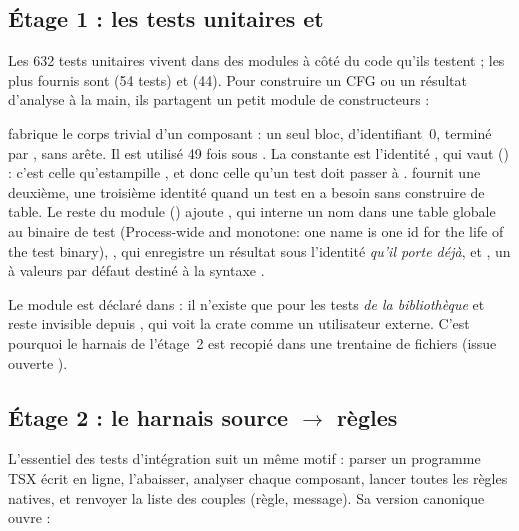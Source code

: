 \subsection{Étage 1 : les tests unitaires et }

Les 632 tests unitaires vivent dans des modules  à côté du code qu'ils testent ; les plus fournis sont  (54 tests) et  (44). Pour construire un CFG ou un résultat d'analyse à la main, ils partagent un petit module de constructeurs :


 fabrique le corps trivial d'un composant : un seul bloc, d'identifiant~0, terminé par , sans arête. Il est utilisé 49 fois sous . La constante  est l'identité , qui vaut  () : c'est celle qu'estampille , et donc celle qu'un test doit passer à .  fournit une deuxième, une troisième identité quand un test en a besoin sans construire de table. Le reste du module () ajoute , qui interne un nom dans une table globale au binaire de test (\og Process-wide and monotone: one name is one id for the life of the test binary\fg{}), , qui enregistre un résultat sous l'identité \emph{qu'il porte déjà}, et , un  à valeurs par défaut destiné à la syntaxe .

\begin{piege}
Le module est déclaré  dans  : il n'existe que pour les tests \emph{de la bibliothèque} et reste invisible depuis , qui voit la crate comme un utilisateur externe. C'est pourquoi le harnais de l'étage~2 est recopié dans une trentaine de fichiers (issue ouverte ).
\end{piege}

\subsection{Étage 2 : le harnais \og source $\to$ règles\fg{}}

L'essentiel des tests d'intégration suit un même motif : parser un programme TSX écrit en ligne, l'abaisser, analyser chaque composant, lancer toutes les règles natives, et renvoyer la liste des couples (règle, message). Sa version canonique ouvre  :

